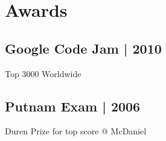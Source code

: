 \documentclass[]{resume}
\begin{document}
\begin{minipage}[t]{0.33\textwidth}
\section{Awards}
\subsection{Google Code Jam | 2010}
Top 3000 Worldwide \\
\sectionsep
\subsection{Putnam Exam | 2006}
Duren Prize for top score @ McDaniel

\sectionsep


%
%

\end{minipage} 
\hfill
\end{document}
